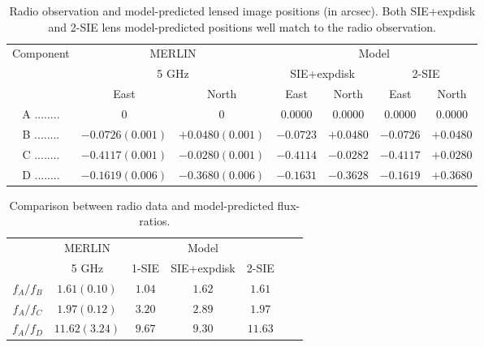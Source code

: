\documentclass[useAMS,usenatbib]{mn2e}
\begin{document}
\begin{table}
 \begin{minipage}{140mm}
  \caption{Radio observation \citep{Marlow99} and model-predicted lensed image positions (in arcsec). Both SIE+expdisk and 2-SIE lens model-predicted positions well match to the radio observation.}
  \begin{tabular}{@{}ccccccc}

\hline

Component	&\multicolumn{2}{c}{MERLIN} 	 & \multicolumn{4}{c}{Model} \\
					&\multicolumn{2}{c}{5 GHz}		&	\multicolumn{2}{c}{SIE+expdisk} &\multicolumn{2}{c}{ 2-SIE}		\\
					 &East &North &East 		&North &East 		&North\\ 
\hline
A ........ &$0$    		&$0$		&$0.0000$ &$0.0000$   &   $0.0000$   &  $ 0.0000$\\  
B ........ &$-0.0726(0.001)$ 	&$+0.0480(0.001)$	&$-0.0723$ &$+0.0480$ & $-0.0726 $  &  $+0.0480$  \\  
C ........ &$-0.4117(0.001)$  &$-0.0280(0.001)$	&$-0.4114$ &$-0.0282$  & $-0.4117 $  &   $+0.0280$ \\  
D ........ &$-0.1619(0.006)$  &$-0.3680(0.006)$	&$-0.1631$ &$-0.3628$  & $-0.1619$    &  $+0.3680$ \\  
\hline
\end{tabular}

\end{minipage}
\medskip



\end{table}

\begin{table}
  \caption{Comparison between radio data \citep{K03} and model-predicted flux-ratios.}
  \begin{tabular}{@{}ccccccc}

\hline
	& MERLIN  & \multicolumn{3}{c}{Model}\\
		&5 GHz   & 1-SIE & SIE+expdisk & 2-SIE\\
\hline
$f_A/f_B$			&$1.61 (0.10)$ &$1.04$& $1.62$ & $1.61$ \\ 
$f_A/f_C$		&$1.97 (0.12)$ 	 &$3.20$ & $2.89$ & $1.97$\\
$f_A/f_D$		&$11.62 (3.24)$  &$9.67$& $9.30$ & $11.63$\\

\hline
\end{tabular}

\medskip


\end{table}
\end{document}
